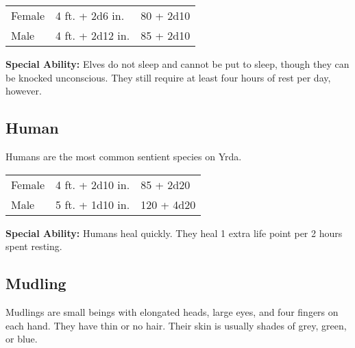 \begin{multicols}{2}
\begin{center}
{
\begin{xtabular}{|l|l|l|}
Female & 4 ft. + 2d6 in. & 80 + 2d10 \\
Male & 4 ft. + 2d12 in. & 85 + 2d10 \\
\hline
\end{xtabular}
}
\end{center}

\textbf{Special Ability:} Elves do not sleep and cannot be put to sleep, though they can be knocked unconscious. They still require at least four hours of rest per day, however.

\subsection{Human}

Humans are the most common sentient species on Yrda.

\begin{center}
{
\begin{xtabular}{|l|l|l|}
Female & 4 ft. + 2d10 in. & 85 + 2d20 \\
Male & 5 ft. + 1d10 in. & 120 + 4d20 \\
\hline
\end{xtabular}
}
\end{center}

\textbf{Special Ability:} Humans heal quickly. They heal 1 extra life point per 2 hours spent resting.

\subsection{Mudling}

Mudlings are small beings with elongated heads, large eyes, and four fingers on each hand. They
have thin or no hair. Their skin is usually shades of grey, green, or blue.


\end{multicols}
